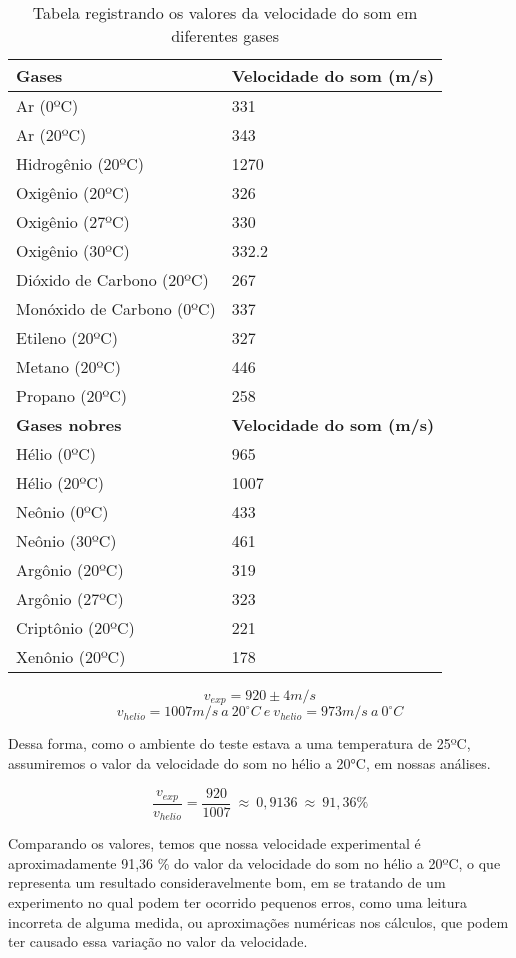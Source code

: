 \begin{table}[H]
    \centering
    \begin{tabular}{ |M{7cm}||M{7cm}|  }
        \hline
        \textbf{Gases} & \textbf{Velocidade do som (m/s)}\\
        \hline 
        Ar (0ºC) & 331 \\
        Ar (20ºC) & 343 \\
        Hidrogênio (20ºC) & 1270\\
        Oxigênio (20ºC) & 326\\
        Oxigênio (27ºC) & 330\\
        Oxigênio (30ºC) & 332.2\\
        Dióxido de Carbono (20ºC) & 267\\
        Monóxido de Carbono (0ºC) & 337\\
        Etileno (20ºC) & 327\\
        Metano (20ºC) & 446\\
        Propano (20ºC) & 258\\
        \hline
        \textbf{Gases nobres} & \textbf{Velocidade do som (m/s)} \\
        \hline
        Hélio (0ºC) & 965\\
        Hélio (20ºC) & 1007\\
        Neônio (0ºC) & 433\\
        Neônio (30ºC) & 461\\
        Argônio (20ºC) & 319\\
        Argônio (27ºC) & 323\\
        Criptônio (20ºC) & 221\\
        Xenônio (20ºC) & 178\\
        \hline
    \end{tabular}
    \caption{Tabela registrando os valores da velocidade do som em diferentes gases}
\end{table}

\[v_{exp} = 920 \pm 4 m/s\]
\[v_{helio} = 1007 m/s \  a \ 20^\circ C \  e  \  v_{helio} = 973 m/s\ a \ 0^\circ C\]

Dessa forma, como o ambiente do teste estava a uma temperatura de 25ºC, assumiremos o valor da velocidade do som no hélio a 20°C, em nossas análises.

\[ \frac{v_{exp}}{v_{helio}}=\frac{920}{1007} \ \approx \ 0,9136 \ \approx \ 91,36\%  \]

Comparando os valores, temos que nossa velocidade experimental é aproximadamente 91,36 \% do valor da velocidade do som no hélio a 20ºC, o que representa um resultado consideravelmente bom, em se tratando de um experimento no qual podem ter ocorrido pequenos erros, como uma leitura incorreta de alguma medida, ou aproximações numéricas nos cálculos, que podem ter causado essa variação no valor da velocidade.

